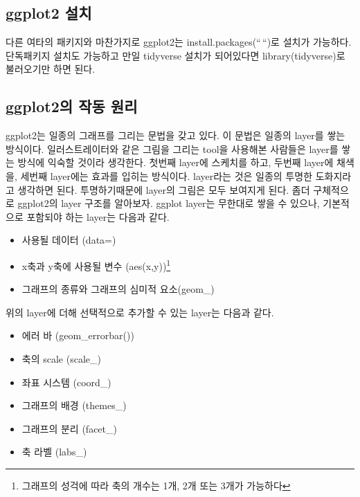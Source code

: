 \documentclass[
]{book}
\providecommand{\tightlist}{%
  \setlength{\itemsep}{0pt}\setlength{\parskip}{0pt}}
\theoremstyle{definition}
\theoremstyle{definition}
\theoremstyle{definition}
\theoremstyle{definition}
\theoremstyle{remark}
\begin{document}
\hypertarget{ggplot2-uxc124uxce58}{%
\subsection{ggplot2 설치}\label{ggplot2-uxc124uxce58}}

다른 여타의 패키지와 마찬가지로 ggplot2는 install.packages(``\,``)로 설치가 가능하다. 단독패키지 설치도 가능하고 만일 tidyverse 설치가 되어있다면
library(tidyverse)로 불러오기만 하면 된다.

\hypertarget{ggplot2uxc758-uxc791uxb3d9-uxc6d0uxb9ac}{%
\subsection{ggplot2의 작동 원리}\label{ggplot2uxc758-uxc791uxb3d9-uxc6d0uxb9ac}}

ggplot2는 일종의 그래프를 그리는 문법을 갖고 있다. 이 문법은 일종의 layer를 쌓는 방식이다. 일러스트레이터와 같은 그림을 그리는 tool을 사용해본 사람들은 layer를 쌓는 방식에 익숙할 것이라 생각한다. 첫번째 layer에 스케치를 하고, 두번째 layer에 채색을, 세번째 layer에는 효과를 입히는 방식이다. layer라는 것은 일종의 투명한 도화지라고 생각하면 된다. 투명하기때문에 layer의 그림은 모두 보여지게 된다.
좀더 구체적으로 ggplot2의 layer 구조를 알아보자. ggplot layer는 무한대로 쌓을 수 있으나, 기본적으로 포함되야 하는 layer는 다음과 같다.

\begin{itemize}
\tightlist
\item
  사용될 데이터 (data=)
\item
  x축과 y축에 사용될 변수 (aes(x,y))\footnote{그래프의 성걱에 따라 축의 개수는 1개, 2개 또는 3개가 가능하다}
\item
  그래프의 종류와 그래프의 심미적 요소(geom\_)
\end{itemize}

위의 layer에 더해 선택적으로 추가할 수 있는 layer는 다음과 같다.

\begin{itemize}
\tightlist
\item
  에러 바 (geom\_errorbar())
\item
  축의 scale (scale\_)
\item
  좌표 시스템 (coord\_)
\item
  그래프의 배경 (themes\_)
\item
  그래프의 분리 (facet\_)
\item
  축 라벨 (labs\_)
\end{itemize}
\end{document}
